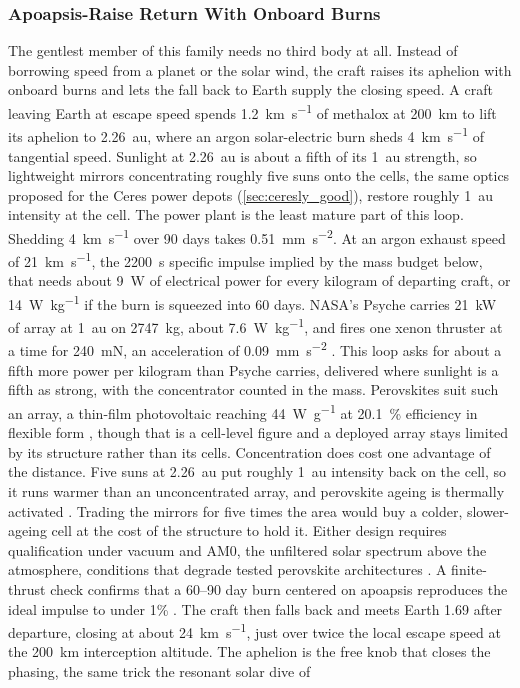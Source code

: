 \documentclass{article}
\begin{document}
\subsubsection{Apoapsis-Raise Return With Onboard Burns}\label{sec:apoapsis_raise_loop}
The gentlest member of this family needs no third body at all. Instead of borrowing speed from a planet or the solar wind, the craft raises its aphelion with onboard burns and lets the fall back to Earth supply the closing speed. A craft leaving Earth at escape speed spends \SI{1.2}{\kilo\meter\per\second} of methalox at \SI{200}{\kilo\meter} to lift its aphelion to \SI{2.26}{\astronomicalunit}, where an argon solar-electric burn sheds \SI{4}{\kilo\meter\per\second} of tangential speed. Sunlight at \SI{2.26}{\astronomicalunit} is about a fifth of its \SI{1}{\astronomicalunit} strength, so lightweight mirrors concentrating roughly five suns onto the cells, the same optics proposed for the Ceres power depots (\autoref{sec:ceresly_good}), restore roughly \SI{1}{\astronomicalunit} intensity at the cell. The power plant is the least mature part of this loop. Shedding \SI{4}{\kilo\meter\per\second} over 90 days takes \SI{0.51}{\milli\meter\per\second\squared}. At an argon exhaust speed of \SI{21}{\kilo\meter\per\second}, the \SI{2200}{\second} specific impulse implied by the mass budget below, that needs about \SI{9}{\watt} of electrical power for every kilogram of departing craft, or \SI{14}{\watt\per\kilo\gram} if the burn is squeezed into 60 days. NASA's Psyche carries \SI{21}{\kilo\watt} of array at \SI{1}{\astronomicalunit} on \SI{2747}{\kilo\gram}, about \SI{7.6}{\watt\per\kilo\gram}, and fires one xenon thruster at a time for \SI{240}{\milli\newton}, an acceleration of \SI{0.09}{\milli\meter\per\second\squared} \cite{psyche_press_kit}. This loop asks for about a fifth more power per kilogram than Psyche carries, delivered where sunlight is a fifth as strong, with the concentrator counted in the mass. Perovskites suit such an array, a thin-film photovoltaic reaching \SI{44}{\watt\per\gram} at \SI{20.1}{\percent} efficiency in flexible form \cite{hailegnaw2024flexible}, though that is a cell-level figure and a deployed array stays limited by its structure rather than its cells. Concentration does cost one advantage of the distance. Five suns at \SI{2.26}{\astronomicalunit} put roughly \SI{1}{\astronomicalunit} intensity back on the cell, so it runs warmer than an unconcentrated array, and perovskite ageing is thermally activated \cite{mavlonov2024thermal}. Trading the mirrors for five times the area would buy a colder, slower-ageing cell at the cost of the structure to hold it. Either design requires qualification under vacuum and AM0, the unfiltered solar spectrum above the atmosphere, conditions that degrade tested perovskite architectures \cite{costa2025perovskite}. A finite-thrust check confirms that a 60--90 day burn centered on apoapsis reproduces the ideal impulse to under 1\% \cite{Katz_aim_is_all_you_need_2025}. The craft then falls back and meets Earth \SI{1.69}{\year} after departure, closing at about \SI{24}{\kilo\meter\per\second}, just over twice the local escape speed at the \SI{200}{\kilo\meter} interception altitude. The aphelion is the free knob that closes the phasing, the same trick the resonant solar dive of 
\end{document}
